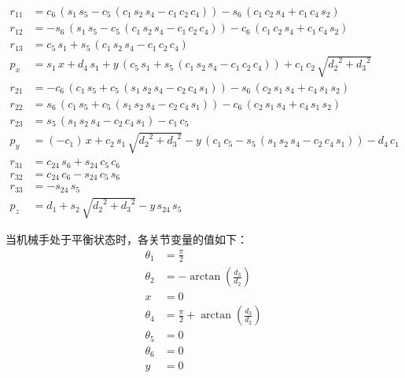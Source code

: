 \documentclass{homework}
\begin{document}
\begin{sol}
\begin{align*} 
r_{11} &= c_{6}\,\left(s_{1}\,s_{5}-c_{5}\,\left(c_{1}\,s_{2}\,s_{4}-c_{1}\,c_{2}\,c_{4}\right)\right)-s_{6}\,\left(c_{1}\,c_{2}\,s_{4}+c_{1}\,c_{4}\,s_{2}\right) \\ 
r_{12} &= -s_{6}\,\left(s_{1}\,s_{5}-c_{5}\,\left(c_{1}\,s_{2}\,s_{4}-c_{1}\,c_{2}\,c_{4}\right)\right)-c_{6}\,\left(c_{1}\,c_{2}\,s_{4}+c_{1}\,c_{4}\,s_{2}\right) \\ 
r_{13} &= c_{5}\,s_{1}+s_{5}\,\left(c_{1}\,s_{2}\,s_{4}-c_{1}\,c_{2}\,c_{4}\right) \\ 
p_x &= s_{1}\,x+d_{4}\,s_{1}+y\,\left(c_{5}\,s_{1}+s_{5}\,\left(c_{1}\,s_{2}\,s_{4}-c_{1}\,c_{2}\,c_{4}\right)\right)+c_{1}\,c_{2}\,\sqrt{{d_{2}}^2+{d_{3}}^2} \\ 
r_{21} &= -c_{6}\,\left(c_{1}\,s_{5}+c_{5}\,\left(s_{1}\,s_{2}\,s_{4}-c_{2}\,c_{4}\,s_{1}\right)\right)-s_{6}\,\left(c_{2}\,s_{1}\,s_{4}+c_{4}\,s_{1}\,s_{2}\right) \\ 
r_{22} &= s_{6}\,\left(c_{1}\,s_{5}+c_{5}\,\left(s_{1}\,s_{2}\,s_{4}-c_{2}\,c_{4}\,s_{1}\right)\right)-c_{6}\,\left(c_{2}\,s_{1}\,s_{4}+c_{4}\,s_{1}\,s_{2}\right) \\ 
r_{23} &= s_{5}\,\left(s_{1}\,s_{2}\,s_{4}-c_{2}\,c_{4}\,s_{1}\right)-c_{1}\,c_{5} \\ 
p_y &= \left(-c_{1}\right)\,x+c_{2}\,s_{1}\,\sqrt{{d_{2}}^2+{d_{3}}^2}-y\,\left(c_{1}\,c_{5}-s_{5}\,\left(s_{1}\,s_{2}\,s_{4}-c_{2}\,c_{4}\,s_{1}\right)\right)-d_{4}\,c_{1} \\ 
r_{31} &= c_{24}\,s_{6}+s_{24}\,c_{5}\,c_{6} \\ 
r_{32} &= c_{24}\,c_{6}-s_{24}\,c_{5}\,s_{6} \\ 
r_{33} &= -s_{24}\,s_{5} \\ 
p_z &= d_{1}+s_{2}\,\sqrt{{d_{2}}^2+{d_{3}}^2}-y\,s_{24}\,s_{5}
\end{align*}

当机械手处于平衡状态时，各关节变量的值如下：
\begin{align*} 
  \theta_1 &= \frac{\pi}{2} \\
  \theta_2 &= -\arctan(\frac{d_3}{d_2}) \\
  x &= 0 \\
  \theta_4 &= \frac{\pi}{2} + \arctan(\frac{d_3}{d_2}) \\
  \theta_5 &= 0 \\
  \theta_6 &= 0 \\
  y &= 0 \\
\end{align*}


\end{sol}
\end{document}
